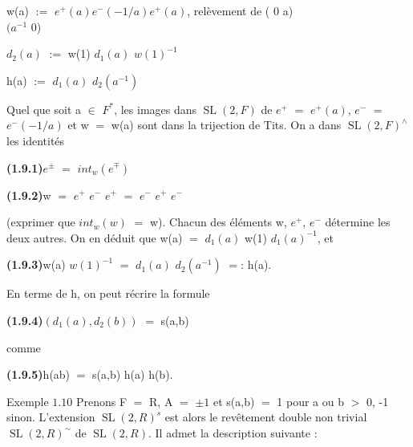 \documentclass[10pt,a4paper]{article}
\begin{document}
\clearpage
{}
\label{d035-physical-011}
\par\smallskip\begin{center}\begin{minipage}{0.96\textwidth}\centering
w(a) $:=$ $e^+(a)e^-(-1/a)e^+(a)$, relèvement de ( 0 a) \\ $(a^{-1}$ 0)
\end{minipage}\end{center}\smallskip
\par $d_2(a)$ $:=$ w(1) $d_1(a)$ $w(1)^{-1}$\par
\par h(a) $:=$ $d_1(a)$ $d_2(a^{-1})$\par
\par Quel que soit a $\in{}$ $F^*$, les images dans $\operatorname{SL}(2,F)$ de $e^+$ $=$ $e^+(a)$, $e^-$ $=$ $e^-(-1/a)$ et w $=$ w(a) sont dans la trijection de Tits. On a dans $\operatorname{SL}(2,F)^\wedge{}$ les identités\par
\par\noindent\textbf{(1.9.1)}\quad $e^\pm{}$ $=$ $int_w(e^\mp{})$\par
\par\noindent\textbf{(1.9.2)}\quad w $=$ $e^+$ $e^-$ $e^+$ $=$ $e^-$ $e^+$ $e^-$\par
\par (exprimer que $int_w(w)$ $=$ w). Chacun des éléments w, $e^+$, $e^-$ détermine les deux autres. On en déduit que w(a) $=$ $d_1(a)$ w(1) $d_1(a)^{-1}$, et\par
\par\noindent\textbf{(1.9.3)}\quad w(a) $w(1)^{-1}$ $=$ $d_1(a)$ $d_2(a^{-1})$ $=$: h(a).\par
\par En terme de h, on peut récrire la formule\par
\par\noindent\textbf{(1.9.4)}\quad $(d_1(a),d_2(b))$ $=$ s(a,b)\par
\par comme\par
\par\noindent\textbf{(1.9.5)}\quad h(ab) $=$ s(a,b) h(a) h(b).\par
\par Exemple $1.10$ Prenons F $=$ R, A $=$ ${\pm{}1}$ et s(a,b) $=$ 1 pour a ou b $>$ 0, -1 sinon. L'extension $\operatorname{SL}(2,R)^s$ est alors le revêtement double non trivial $\operatorname{SL}(2,R)^\sim$ de $\operatorname{SL}(2,R)$. Il admet la description suivante :\par
\end{document}

